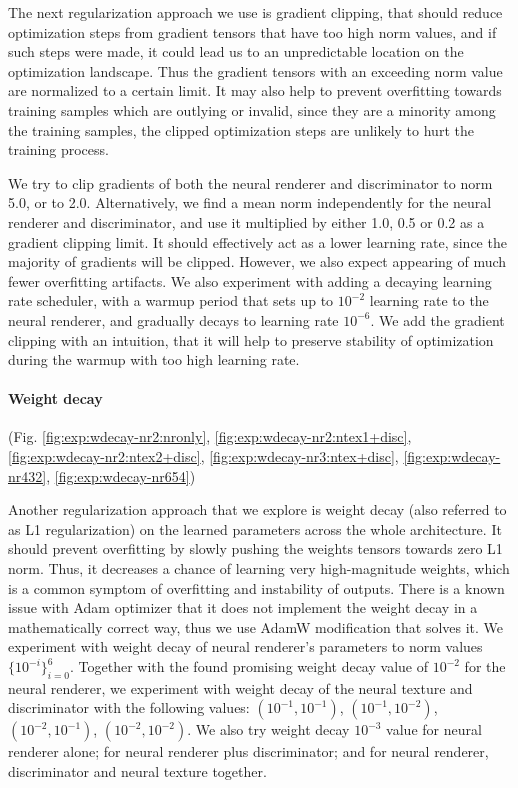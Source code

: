 The next regularization approach we use is gradient clipping, that should reduce optimization steps from gradient tensors that have too high norm values, and if such steps were made, it could lead us to an unpredictable location on the optimization landscape. Thus the gradient tensors with an exceeding norm value are normalized to a certain limit. It may also help to prevent overfitting towards training samples which are outlying or invalid, since they are a minority among the training samples, the clipped optimization steps are unlikely to hurt the training process.

We try to clip gradients of both the neural renderer and discriminator to norm 5.0, or to 2.0. Alternatively, we find a mean norm independently for the neural renderer and discriminator, and use it multiplied by either 1.0, 0.5 or 0.2 as a gradient clipping limit. It should effectively act as a lower learning rate, since the majority of gradients will be clipped. However, we also expect appearing of much fewer overfitting artifacts. We also experiment with adding a decaying learning rate scheduler, with a warmup period that sets up to $10^{-2}$ learning rate to the neural renderer, and gradually decays to learning rate $10^{-6}$. We add the gradient clipping with an intuition, that it will help to preserve stability of optimization during the warmup with too high learning rate.

\vspace{-15pt}\paragraph{Weight decay}(Fig. \ref{fig:exp:wdecay-nr2:nronly}, \ref{fig:exp:wdecay-nr2:ntex1+disc}, \ref{fig:exp:wdecay-nr2:ntex2+disc}, \ref{fig:exp:wdecay-nr3:ntex+disc}, \ref{fig:exp:wdecay-nr432}, \ref{fig:exp:wdecay-nr654})\mbox{}\nopagebreak

Another regularization approach that we explore is weight decay (also referred to as L1 regularization) on the learned parameters across the whole architecture. It should prevent overfitting by slowly pushing the weights tensors towards zero L1 norm. Thus, it decreases a chance of learning very high-magnitude weights, which is a common symptom of overfitting and instability of outputs. There is a known issue with Adam optimizer that it does not implement the weight decay in a mathematically correct way, thus we use AdamW \cite{aux:adamw17} modification that solves it. We experiment with weight decay of neural renderer's parameters to norm values $\{10^{-i}\}^{6}_{i=0}$. Together with the found promising weight decay value of $10^{-2}$ for the neural renderer, we experiment with weight decay of the neural texture and discriminator with the following values: $(10^{-1}, 10^{-1})$, $(10^{-1}, 10^{-2})$, $(10^{-2}, 10^{-1})$, $(10^{-2}, 10^{-2})$. We also try weight decay $10^{-3}$ value for neural renderer alone; for neural renderer plus discriminator; and for neural renderer, discriminator and neural texture together.


